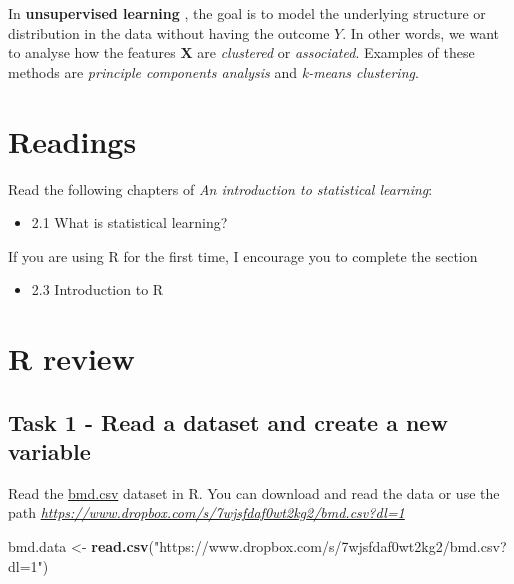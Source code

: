 \documentclass[
]{book}
\newenvironment{Shaded}{\begin{snugshade}}{\end{snugshade}}
\newcommand{\FunctionTok}[1]{\textcolor[rgb]{0.13,0.29,0.53}{\textbf{#1}}}
\newcommand{\NormalTok}[1]{#1}
\newcommand{\OtherTok}[1]{\textcolor[rgb]{0.56,0.35,0.01}{#1}}
\newcommand{\StringTok}[1]{\textcolor[rgb]{0.31,0.60,0.02}{#1}}
\providecommand{\tightlist}{%
  \setlength{\itemsep}{0pt}\setlength{\parskip}{0pt}}
\begin{document}
In \textbf{unsupervised learning} , the goal is to model the
underlying structure or distribution in the data without having the outcome \(Y\).
In other words, we want to analyse how the features \(\mathbf{X}\) are \emph{clustered}
or \emph{associated}. Examples of these methods are \emph{principle components analysis}
and \emph{k-means clustering}.

\section{Readings}\label{readings}

Read the following chapters of \emph{An introduction to statistical learning}:

\begin{itemize}
\tightlist
\item
  2.1 What is statistical learning?
\end{itemize}

If you are using R for the first time, I encourage you to complete the section

\begin{itemize}
\tightlist
\item
  2.3 Introduction to R
\end{itemize}

\section{R review}\label{r-review}

\subsection*{Task 1 - Read a dataset and create a new variable}\label{task-1---read-a-dataset-and-create-a-new-variable}

Read the \href{https://www.dropbox.com/s/7wjsfdaf0wt2kg2/bmd.csv?dl=1}{bmd.csv}
dataset in R. You can download and read the data or use the path \emph{\url{https://www.dropbox.com/s/7wjsfdaf0wt2kg2/bmd.csv?dl=1}}

\begin{Shaded}
\begin{Highlighting}[]
\NormalTok{bmd.data }\OtherTok{\textless{}{-}} \FunctionTok{read.csv}\NormalTok{(}\StringTok{"https://www.dropbox.com/s/7wjsfdaf0wt2kg2/bmd.csv?dl=1"}\NormalTok{)}
\end{Highlighting}
\end{Shaded}
\end{document}
